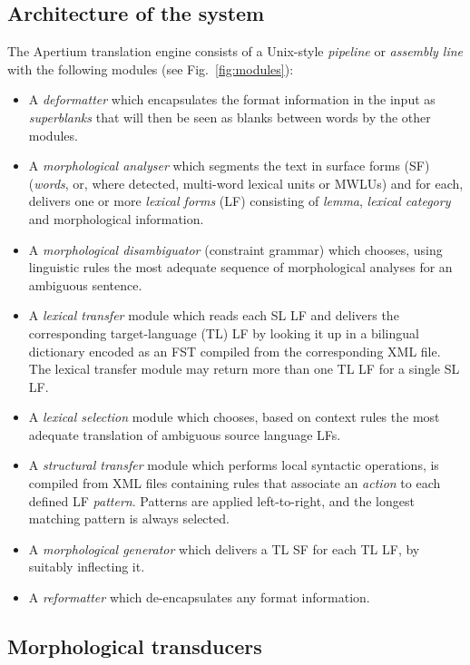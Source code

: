 \documentclass[11pt]{article}
\newenvironment{itemise}[1]{
        \begin{itemize}\setlength{\itemsep}{-0.3em}
        \vspace{-0.6em}
        #1
}{
        \end{itemize}
        \vspace{-1pt}
}
\begin{document}
\subsection{Architecture of the system}

The Apertium translation engine consists of a Unix-style \emph{pipeline} or
\emph{assembly line} with the following modules (see Fig.~\ref{fig:modules}):  
\begin{itemise}
\item A \emph{deformatter} which encapsulates the format information
 in the input as \emph{superblanks} that will then be seen
 as blanks between words by the other modules.
\item A \emph{morphological analyser} which segments the text in
  surface forms (SF) (\emph{words}, or, where detected, multi-word lexical
  units or MWLUs) and for each, delivers one or more \emph{lexical
    forms} (LF) consisting of \emph{lemma}, \emph{lexical category} and
  morphological information. 
\item A \emph{morphological disambiguator} (constraint grammar) which chooses, using linguistic rules
  the most adequate sequence of morphological analyses for an ambiguous sentence. 
\item A \emph{lexical transfer} module which reads each SL LF 
  and delivers the corresponding target-language (TL) LF
  by looking it up in a bilingual dictionary encoded as an FST
  compiled from the corresponding XML file. The lexical transfer module may
  return more than one TL LF for a single SL LF.
\item A \emph{lexical selection} module which chooses, based on context 
  rules the most adequate translation of ambiguous source language LFs.
\item A \emph{structural transfer} module which
    performs local syntactic operations, is compiled from XML files containing rules that 
    associate an \emph{action} to each defined LF \emph{pattern}. Patterns are applied left-to-right, and the 
    longest matching pattern is always selected.
\item A \emph{morphological generator} which delivers a TL SF
 for each TL LF, by suitably inflecting it. 
\item A \emph{reformatter} which de-encapsulates any format
  information.
\end{itemise}


\subsection{Morphological transducers}
\end{document}
